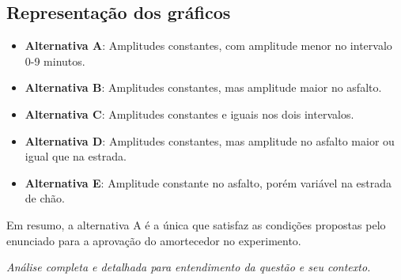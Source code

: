 \documentclass{article}
\begin{document}
\subsection*{Representação dos gráficos}

\begin{itemize}
  \item \textbf{Alternativa A}: Amplitudes constantes, com amplitude menor no intervalo 0-9 minutos.
  \item \textbf{Alternativa B}: Amplitudes constantes, mas amplitude maior no asfalto.
  \item \textbf{Alternativa C}: Amplitudes constantes e iguais nos dois intervalos.
  \item \textbf{Alternativa D}: Amplitudes constantes, mas amplitude no asfalto maior ou igual que na estrada.
  \item \textbf{Alternativa E}: Amplitude constante no asfalto, porém variável na estrada de chão.
\end{itemize}

Em resumo, a alternativa A é a única que satisfaz as condições propostas pelo enunciado para a aprovação do amortecedor no experimento.

\vspace{1em}
\begin{center}
\textit{Análise completa e detalhada para entendimento da questão e seu contexto.}
\end{center}
\end{document}
